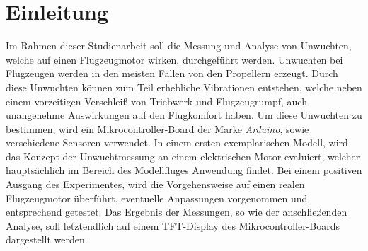 
\chapter{Einleitung}
Im Rahmen dieser Studienarbeit soll die Messung und Analyse von Unwuchten, welche auf einen Flugzeugmotor wirken, durchgeführt werden. Unwuchten bei Flugzeugen werden in den meisten Fällen von den Propellern erzeugt. Durch diese Unwuchten können zum Teil erhebliche Vibrationen entstehen, welche neben einem vorzeitigen Verschleiß von Triebwerk und Flugzeugrumpf, auch unangenehme Auswirkungen auf den Flugkomfort haben. Um diese Unwuchten zu bestimmen, wird ein Mikrocontroller-Board der Marke \textit{Arduino}, sowie verschiedene Sensoren verwendet. In einem ersten exemplarischen Modell, wird das Konzept der Unwuchtmessung an einem elektrischen Motor evaluiert, welcher hauptsächlich im Bereich des Modellfluges Anwendung findet. Bei einem positiven Ausgang des Experimentes, wird die Vorgehensweise auf einen realen Flugzeugmotor überführt, eventuelle Anpassungen vorgenommen und entsprechend getestet. Das Ergebnis der Messungen, so wie der anschließenden Analyse, soll letztendlich auf einem TFT-Display des Mikrocontroller-Boards dargestellt werden.
